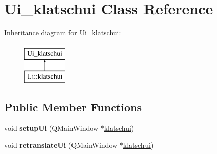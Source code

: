 \hypertarget{class_ui__klatschui}{}\section{Ui\+\_\+klatschui Class Reference}
\label{class_ui__klatschui}
Inheritance diagram for Ui\+\_\+klatschui\+:\begin{figure}[H]
\begin{center}
\leavevmode
\includegraphics[height=2.000000cm]{class_ui__klatschui}
\end{center}
\end{figure}
\subsection*{Public Member Functions}
\begin{DoxyCompactItemize}
\item 
void {\bfseries setup\+Ui} (Q\+Main\+Window $\ast$\hyperlink{classklatschui}{klatschui})\hypertarget{class_ui__klatschui_a402a6ca7cea172ad1f1b037e8216b6be}{}\label{class_ui__klatschui_a402a6ca7cea172ad1f1b037e8216b6be}

\item 
void {\bfseries retranslate\+Ui} (Q\+Main\+Window $\ast$\hyperlink{classklatschui}{klatschui})\hypertarget{class_ui__klatschui_ab5513321f6e1f098260c80f6c741a925}{}\label{class_ui__klatschui_ab5513321f6e1f098260c80f6c741a925}

\end{DoxyCompactItemize}
